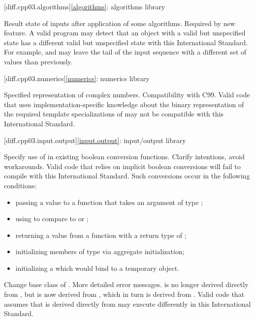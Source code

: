 [diff.cpp03.algorithms]{\ref{algorithms}: algorithms library}

\change Result state of inputs after application of some algorithms.
\rationale Required by new feature.
\effect
A valid \CppIII{} program may detect that an object with a valid but
unspecified state has a different valid but unspecified state with this
International Standard. For example,  and
 may leave the tail of the input sequence with a
different set of values than previously.

[diff.cpp03.numerics]{\ref{numerics}: numerics library}

\change Specified representation of complex numbers.
\rationale Compatibility with C99.
\effect
Valid \CppIII{} code that uses implementation-specific knowledge about the
binary representation of the required template specializations of
 may not be compatible with this International Standard.

[diff.cpp03.input.output]{\ref{input.output}: input/output library}

\change Specify use of  in existing boolean conversion functions.
\rationale Clarify intentions, avoid workarounds.
\effect
Valid \CppIII{} code that relies on implicit boolean conversions will fail to
compile with this International Standard. Such conversions occur in the
following conditions:

\begin{itemize}
\item passing a value to a function that takes an argument of type ;
\item using  to compare to  or ;
\item returning a value from a function with a return type of ;
\item initializing members of type  via aggregate initialization;
\item initializing a  which would bind to a temporary object.
\end{itemize}

\change Change base class of .
\rationale More detailed error messages.
\effect
{} is no longer derived directly from
, but is now derived from ,
which in turn is derived from . Valid \CppIII{} code
that assumes that  is derived directly from
 may execute differently in this International Standard.

